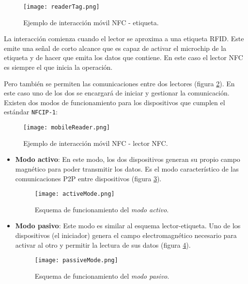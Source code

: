   \begin{figure}[!h]
    \begin{center}
      \texttt{[image: readerTag.png]}
      \caption{Ejemplo de interacción móvil \acs{NFC} - etiqueta.}
      \label{fig:readerTag}
    \end{center}
  \end{figure}

La interacción comienza cuando el lector se aproxima a una etiqueta
\acs{RFID}. Este emite una señal de corto alcance que es capaz de activar 
el microchip de la etiqueta y de hacer que emita los datos que contiene. En 
este caso el lector \acs{NFC} es siempre el que inicia la operación.

Pero también se permiten las comunicaciones entre dos lectores (figura
\ref{fig:mobileReader}). En este caso uno de los dos se encargará de iniciar y 
gestionar la comunicación. Existen dos modos de funcionamiento para los
dispositivos que cumplen el estándar \texttt{NFCIP-1}:

  \begin{figure}[!h]
    \begin{center}
      \texttt{[image: mobileReader.png]}
      \caption{Ejemplo de interacción móvil \acs{NFC} - lector \acs{NFC}.}
      \label{fig:mobileReader}
    \end{center}
  \end{figure}

\begin{itemize}
\item \textbf{Modo activo}:
En este modo, los dos dispositivos generan su propio campo magnético para
poder transmitir los datos. Es el modo característico de las comunicaciones
\acs{P2P} entre dispositivos (figura \ref{fig:activeMode}).

  \begin{figure}[!h]
    \begin{center}
      \texttt{[image: activeMode.png]}
      \caption{Esquema de funcionamiento del \emph{modo activo}.}
      \label{fig:activeMode}
    \end{center}
  \end{figure}

\item \textbf{Modo pasivo}:
Este modo es similar al esquema lector-etiqueta. Uno de los dispositivos
(el iniciador) genera el campo electromagnético necesario para activar al otro
y permitir la lectura de sus datos (figura \ref{fig:passiveMode}).

  \begin{figure}[!h]
    \begin{center}
      \texttt{[image: passiveMode.png]}
      \caption{Esquema de funcionamiento del \emph{modo pasivo}.}
      \label{fig:passiveMode}
    \end{center}
  \end{figure}
\end{itemize}

